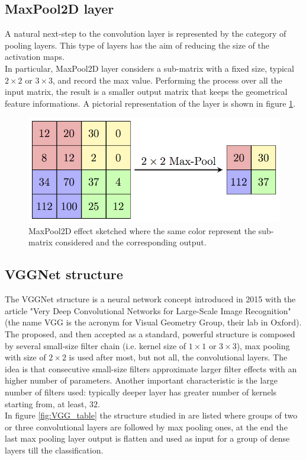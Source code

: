 \subsection*{MaxPool2D layer}
A natural next-step to the convolution layer is represented by the category of pooling layers. This type of layers has the aim of reducing the size of the activation maps.\\
In particular, MaxPool2D layer considers a sub-matrix with a fixed size, typical $2\times2$ or $3\times3$, and record the max value. Performing the process over all the input matrix, the result is a smaller output matrix that keeps the geometrical feature informations. A pictorial representation of the layer is shown in figure \ref{fig:MaxPool}.

\begin{figure}[b]
	\centering
	\includegraphics[width=.6\textwidth]{IMG/Cap6/MaxpoolSample2.png}
	\caption{MaxPool2D effect sketched where the same color represent the sub-matrix considered and the corresponding output.}
	\label{fig:MaxPool}
\end{figure}


\subsection*{VGGNet structure} \label{subsec:VGGNet_teo}
The VGGNet structure is a neural network concept introduced in 2015 with the article "Very Deep Convolutional Networks for Large-Scale Image Recognition" \cite{VGGArt} (the name VGG is the acronym for Visual Geometry Group, their lab in Oxford).\\
The proposed, and then accepted as a standard, powerful structure is composed by several small-size filter chain (i.e. kernel size of $1\times1$ or $3\times3$), max pooling with size of $2\times2$ is used after most, but not all, the convolutional layers. The idea is that consecutive small-size filters approximate larger filter effects with an higher number of parameters. Another important characteristic is the large number of filters used: typically deeper layer has greater number of kernels starting from, at least, $32$.\\
In figure \ref{fig:VGG_table} the structure studied in \cite{VGGArt} are listed where groups of two or three convolutional layers are followed by max pooling ones, at the end the last max pooling layer output is flatten and used as input for a group of dense layers till the classification.\\

